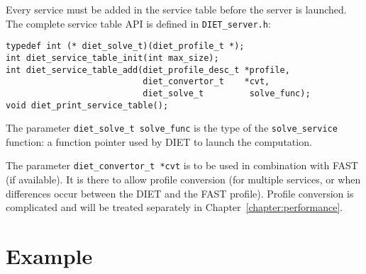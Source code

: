 Every service must be added in the service table before the server is
launched. The complete service table API is defined in \texttt{DIET\_server.h}:
{\footnotesize
\begin{verbatim}
typedef int (* diet_solve_t)(diet_profile_t *);
int diet_service_table_init(int max_size);
int diet_service_table_add(diet_profile_desc_t *profile,
                           diet_convertor_t    *cvt,
                           diet_solve_t         solve_func);
void diet_print_service_table();
\end{verbatim}
}

The parameter \texttt{diet\_solve\_t solve\_func} is the type of the
\texttt{solve\_service} function: a function pointer used by DIET to launch the
computation.

The parameter \texttt{diet\_convertor\_t *cvt} is to be used in combination
with FAST (if available). It is there to allow profile conversion (for
multiple services, or when differences occur between the DIET and the FAST
profile). Profile conversion is complicated and will be treated
separately in Chapter~\ref{chapter:performance}.

\section{Example}
\label{sec:sv_ex}

